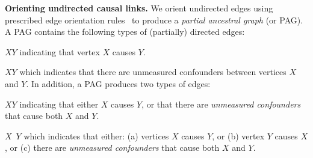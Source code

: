 \noindent \textbf{Orienting undirected causal links.} We orient undirected edges using prescribed edge orientation rules~\cite{spirtes2000causation,ogarrio2016hybrid, glymour2019review,colombo2012learning,colombo2014order} to produce a \textit{partial ancestral graph} (or PAG). A PAG contains the following types of (partially) directed edges: 
\bi[leftmargin=*, topsep=0pt]
\item $X$\edgeone$Y$ indicating that vertex $X$ causes $Y$. 
\item $X$\edgetwo$Y$ which indicates that there are unmeasured confounders between vertices $X$ and $Y$.
\ei
\noindent In addition, a PAG produces two types of edges:
\bi[leftmargin=*, topsep=0pt]
\item $X$\edgethree$Y$ indicating that either $X$ causes $Y$, or that there are \textit{unmeasured confounders} that cause both $X$ and $Y$.
\item $X$\edgefour~$Y$ which indicates that either: (a) vertices $X$ causes $Y$, or (b) vertex $Y$ causes $X$, or (c) there are \textit{unmeasured confounders} that cause both $X$ and $Y$.
\ei
